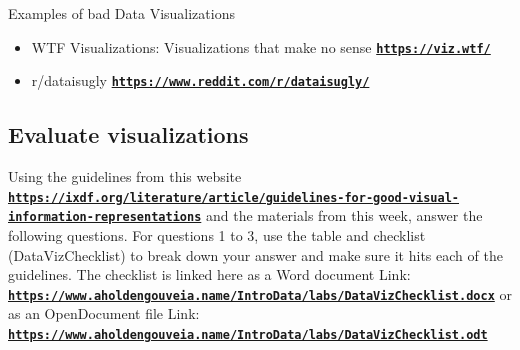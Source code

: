 \documentclass[12pt]{article}
\begin{document}
Examples of bad Data Visualizations
\begin{itemize}
    \item WTF Visualizations: Visualizations that make no sense \href{https://viz.wtf/}{\textbf{\nolinkurl{https://viz.wtf/}}}
    \item r/dataisugly \href{https://www.reddit.com/r/dataisugly/}{\textbf{\nolinkurl{https://www.reddit.com/r/dataisugly/}}}
\end{itemize}


\subsection*{Evaluate visualizations}
Using the guidelines from this website \href{https://ixdf.org/literature/article/guidelines-for-good-visual-information-representations}{\textbf{\nolinkurl{https://ixdf.org/literature/article/guidelines-for-good-visual-information-representations}}} and the materials from this week, answer the following questions.  For questions 1 to 3, use the table and checklist (DataVizChecklist) to break down your answer and make sure it hits each of the guidelines. The checklist is linked here as a Word document Link: \href{https://www.aholdengouveia.name/IntroData/labs/DataVizChecklist.docx}{\textbf{\nolinkurl{https://www.aholdengouveia.name/IntroData/labs/DataVizChecklist.docx}}} or as an OpenDocument file Link: \href{https://www.aholdengouveia.name/IntroData/labs/DataVizChecklist.odt}{\textbf{\nolinkurl{https://www.aholdengouveia.name/IntroData/labs/DataVizChecklist.odt}}}
\end{document}
